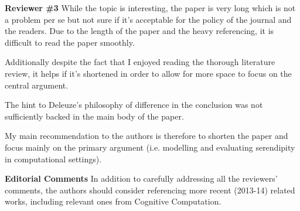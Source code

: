 \textbf{Reviewer \#3}
While the topic is interesting, the paper is very long which is not a problem per se but not sure if
it's acceptable for the policy of the journal and the readers. Due to the length of the paper and
the heavy referencing, it is difficult to read the paper smoothly.

Additionally despite the fact that I enjoyed reading the thorough literature review, it helps if it's
shortened in order to allow for more space to focus on the central argument.

The hint to Deleuze's philosophy of difference in the conclusion was not sufficiently backed in
the main body of the paper.

My main recommendation to the authors is therefore to shorten the paper and focus mainly on
the primary argument (i.e. modelling and evaluating serendipity in computational settings).

\textbf{Editorial Comments}
In addition to carefully addressing all the reviewers' comments, the authors should consider
referencing more recent (2013-14) related works, including relevant ones from Cognitive
Computation.
